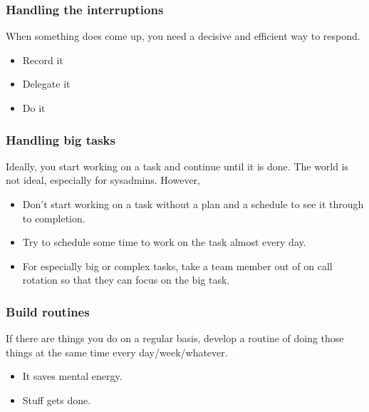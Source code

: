 \documentclass[10pt]{beamer}
\begin{document}
\begin{frame}
  \frametitle{Handling the interruptions}
  
    When something does come up, you need a decisive and efficient 
    way to respond.
    
    \begin{itemize}
    \item Record it
    \item Delegate it
    \item Do it    
    \end{itemize}
     
\end{frame}

\begin{frame}
  \frametitle{Handling big tasks}
  
   Ideally, you start working on a task and continue until it is done.
   The world is not ideal, especially for sysadmins. However,
   
   \begin{itemize}
     \item Don't start working on a task without a plan and a schedule
     to see it through to completion.
     \item Try to schedule some time to work on the task almost every day.
     \item For especially big or complex tasks, take a team member out of
     on call rotation so that they can focus on the big task.
   \end{itemize}
   
\end{frame}
\begin{frame}
  \frametitle{Build routines}
  
    If there are things you do on a regular basis, develop a routine of doing 
    those things at the same time every day/week/whatever.
    
    \begin{itemize}
      \item It saves mental energy.
      \item Stuff gets done.
    \end{itemize}
     
\end{frame}
\end{document}
